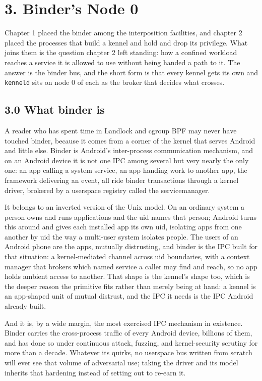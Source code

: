 \hypertarget{binders-node-0}{%
\chapter{3. Binder's Node 0}\label{binders-node-0}}

Chapter 1 placed the binder among the interposition facilities, and
chapter 2 placed the processes that build a kennel and hold and drop its
privilege. What joins them is the question chapter 2 left standing: how
a confined workload reaches a service it is allowed to use without being
handed a path to it. The answer is the binder bus, and the short form is
that every kennel gets its own and \texttt{kenneld} sits on node 0 of
each as the broker that decides what crosses.

\hypertarget{what-binder-is}{%
\section{3.0 What binder is}\label{what-binder-is}}

A reader who has spent time in Landlock and cgroup BPF may never have
touched binder, because it comes from a corner of the kernel that serves
Android and little else. Binder is Android's inter-process communication
mechanism, and on an Android device it is not one IPC among several but
very nearly the only one: an app calling a system service, an app
handing work to another app, the framework delivering an event, all ride
binder transactions through a kernel driver, brokered by a userspace
registry called the servicemanager.

It belongs to an inverted version of the Unix model. On an ordinary
system a person owns and runs applications and the uid names that
person; Android turns this around and gives each installed app its own
uid, isolating apps from one another by uid the way a multi-user system
isolates people. The users of an Android phone are the apps, mutually
distrusting, and binder is the IPC built for that situation: a
kernel-mediated channel across uid boundaries, with a context manager
that brokers which named service a caller may find and reach, so no app
holds ambient access to another. That shape is the kennel's shape too,
which is the deeper reason the primitive fits rather than merely being
at hand: a kennel is an app-shaped unit of mutual distrust, and the IPC
it needs is the IPC Android already built.

And it is, by a wide margin, the most exercised IPC mechanism in
existence. Binder carries the cross-process traffic of every Android
device, billions of them, and has done so under continuous attack,
fuzzing, and kernel-security scrutiny for more than a decade. Whatever
its quirks, no userspace bus written from scratch will ever see that
volume of adversarial use; taking the driver and its model inherits that
hardening instead of setting out to re-earn it.

